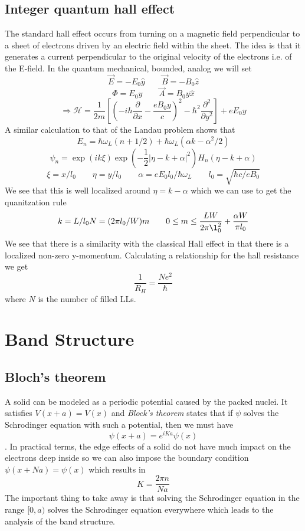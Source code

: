 \documentclass{article}
\begin{document}
\subsection{Integer quantum hall effect}
The standard hall effect occurs from turning on a magnetic field perpendicular to a sheet of electrons driven by an electric field within the sheet. The idea is that it generates a current perpendicular to the original velocity of the electrons i.e. of the E-field. In the quantum mechanical, bounded, analog we will set
$$\vec E =-E_0\hat y \qquad \vec B = -B_0 \hat z$$
$$\Phi = E_0 y \qquad \vec A = B_0y \hat x$$
$$\Rightarrow \mathcal H = \frac{1}{2m}\left[\left(-ih\frac{\partial}{\partial x} - \frac{eB_0y}{c}\right)^2 -\hbar^2 \frac{\partial^2}{\partial y^2}\right] + eE_0y$$
A similar calculation to that of the Landau problem shows that 
$$E_n=\hbar \omega_L (n+1/2)+\hbar \omega_L (\alpha k-\alpha^2/2)$$
$$\psi_n = 	\exp(ik\xi)\exp\left(-\frac{1}{2}|\eta-k+\alpha|^2\right)H_n(\eta-k+\alpha)$$
$$\xi = x/l_0 \qquad \eta = y/l_0 \qquad \alpha = eE_0l_0/\hbar \omega_L \qquad l_0 = \sqrt{\hbar c/eB_0}$$
We see that this is well localized around $\eta = k-\alpha$ which we can use to get the quanitzation rule $$k=L/l_0N=(2\pi l_0/W)m\qquad 0\leq m \leq \frac{LW}{2\pi\l_0^2}+\frac{\alpha W}{\pi l_0}$$
We see that there is a similarity with the classical Hall effect in that there is a localized non-zero y-momentum. Calculating a relationship for the hall resistance we get $$\frac{1}{R_H} = \frac{Ne^2}{\hbar}$$
where $N$ is the number of filled LLs.

\section{Band Structure}
\subsection{Bloch's theorem}
A solid can be modeled as a periodic potential caused by the packed nuclei. It satisfies $V(x+a)=V(x)$ and \emph{Block's theorem} states that if $\psi$ solves the Schrodinger equation with such a potential, then we must have $$\psi(x+a) = e^{iKa}\psi(x)$$.
In practical terms, the edge effects of a solid do not have much impact on the electrons deep inside so we can also impose the boundary condition $\psi(x+Na)=\psi(x)$ which results in $$K=\frac{2\pi n}{Na}$$
The important thing to take away is that solving the Schrodinger equation in the range $[0, a)$ solves the Schrodinger equation everywhere which leads to the analysis of the band structure.
\end{document}
